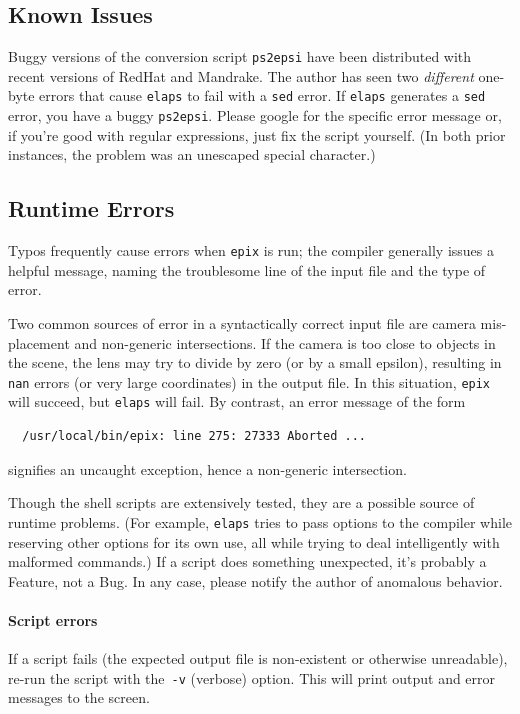 \documentclass[12pt]{report}
\newcommand{\code}[1]{\texttt{#1}}
\begin{document}
\subsection*{Known Issues}

Buggy versions of the conversion script \code{ps2epsi} have been
distributed with recent versions of RedHat and Mandrake. The author
has seen two \emph{different} one-byte errors that cause \code{elaps}
to fail with a \code{sed} error. If \code{elaps} generates a
\code{sed} error, you have a buggy \code{ps2epsi}.  Please google for
the specific error message or, if you're good with regular
expressions, just fix the script yourself. (In both prior instances,
the problem was an unescaped special character.)


\subsection*{Runtime Errors}

Typos frequently cause errors when \code{epix} is run; the compiler
generally issues a helpful message, naming the troublesome line of the
input file and the type of error.

Two common sources of error in a syntactically correct input file are
camera mis-placement and non-generic intersections. If the camera is
too close to objects in the scene, the lens may try to divide by zero
(or by a small epsilon), resulting in \code{nan} errors (or very large
coordinates) in the output file. In this situation, \code{epix} will
succeed, but \code{elaps} will fail. By contrast, an error message of
the form
\begin{verbatim}
  /usr/local/bin/epix: line 275: 27333 Aborted ...
\end{verbatim}
signifies an uncaught exception, hence a non-generic intersection.

Though the shell scripts are extensively tested, they are a possible
source of runtime problems. (For example, \code{elaps} tries to pass
options to the compiler while reserving other options for its own use,
all while trying to deal intelligently with malformed commands.) If a
script does something unexpected, it's probably a Feature, not a Bug.
In any case, please notify the author of anomalous behavior.

\paragraph{Script errors}
If a script fails (the expected output file is non-existent or
otherwise unreadable), re-run the script with the~\code{-v} (verbose)
option. This will print output and error messages to the screen.
\end{document}
